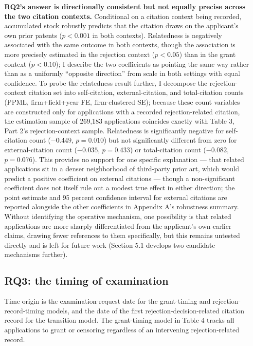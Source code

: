 \documentclass[12pt]{article}
\begin{document}
\textbf{RQ2's answer is directionally consistent but not equally precise across the two citation contexts.} Conditional on a citation context being recorded, accumulated stock robustly predicts that the citation draws on the applicant's own prior patents ($p<0.001$ in both contexts). Relatedness is negatively associated with the same outcome in both contexts, though the association is more precisely estimated in the rejection context ($p<0.05$) than in the grant context ($p<0.10$); I describe the two coefficients as pointing the same way rather than as a uniformly ``opposite direction'' from scale in both settings with equal confidence. To probe the relatedness result further, I decompose the rejection-context citation set into self-citation, external-citation, and total-citation counts (PPML, firm+field+year FE, firm-clustered SE); because these count variables are constructed only for applications with a recorded rejection-related citation, the estimation sample of 269,183 applications coincides exactly with Table 3, Part 2's rejection-context sample. Relatedness is significantly negative for self-citation count ($-0.449$, $p=0.010$) but not significantly different from zero for external-citation count ($-0.035$, $p=0.433$) or total-citation count ($-0.082$, $p=0.076$). This provides no support for one specific explanation --- that related applications sit in a denser neighborhood of third-party prior art, which would predict a positive coefficient on external citations --- though a non-significant coefficient does not itself rule out a modest true effect in either direction; the point estimate and 95 percent confidence interval for external citations are reported alongside the other coefficients in Appendix A's robustness summary. Without identifying the operative mechanism, one possibility is that related applications are more sharply differentiated from the applicant's own earlier claims, drawing fewer references to them specifically, but this remains untested directly and is left for future work (Section 5.1 develops two candidate mechanisms further).

\subsection{RQ3: the timing of examination}

Time origin is the examination-request date for the grant-timing and rejection-record-timing models, and the date of the first rejection-decision-related citation record for the transition model. The grant-timing model in Table 4 tracks all applications to grant or censoring regardless of an intervening rejection-related record.
\end{document}
